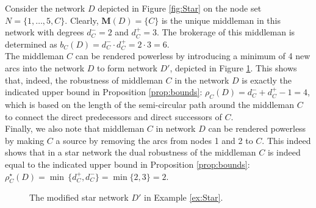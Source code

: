 \begin{example} \label{ex:Star}
	Consider the network $D$ depicted in Figure \ref{fig:Star} on the node set $N = \{ 1, \ldots ,5,C \}$. Clearly, $\mathbf M (D) = \{ C \}$ is the unique middleman in this network with degrees $d^-_C =2$ and $d^+_C =3$. The brokerage of this middleman is determined as $b_C (D) = d^-_C \cdot d^+_C = 2 \cdot 3 =6$.
	\\
	The middleman $C$ can be rendered powerless by introducing a minimum of 4 new arcs into the network $D$ to form network $D'$, depicted in Figure \ref{fig:StarMod}. This shows that, indeed, the robustness of middleman $C$ in the network $D$ is exactly the indicated upper bound in Proposition \ref{prop:bounds}: $\rho_C (D) = d^-_C + d^+_C -1 =4$, which is based on the length of the semi-circular path around the middleman $C$ to connect the direct predecessors and direct successors of $C$.
	\\
	Finally, we also note that middleman $C$ in network $D$ can be rendered powerless by making $C$ a source by removing the arcs from nodes 1 and 2 to $C$. This indeed shows that in a star network the dual robustness of the middleman $C$ is indeed equal to the indicated upper bound in Proposition \ref{prop:bounds}: $\rho_C^{\star} (D) = \min \, \{ d^+_C , d^-_C \} = \min \{ 2,3 \} =2$.
\end{example}

\begin{figure}[h]
\begin{center}
\end{center}
\caption{The modified star network $D'$ in Example \ref{ex:Star}.}
\label{fig:StarMod}
\end{figure}


